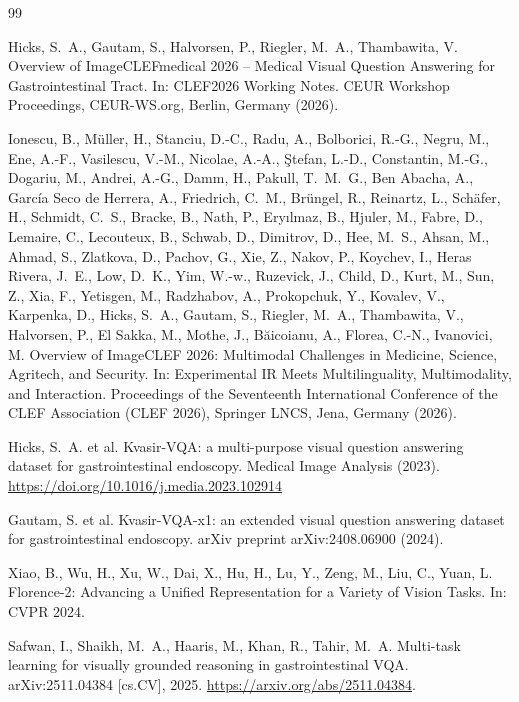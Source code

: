 \documentclass{ceurart}
\begin{document}

\begin{thebibliography}{99}

Hicks, S.\ A., Gautam, S., Halvorsen, P., Riegler, M.\ A., Thambawita, V.
Overview of ImageCLEFmedical 2026 -- Medical Visual Question Answering for
Gastrointestinal Tract. In: CLEF2026 Working Notes. CEUR Workshop Proceedings,
CEUR-WS.org, Berlin, Germany (2026).

Ionescu, B., M{\"u}ller, H., Stanciu, D.-C., Radu, A., Bolborici, R.-G., Negru, M., Ene, A.-F., Vasilescu, V.-M., Nicolae, A.-A., \c{S}tefan, L.-D., Constantin, M.-G., Dogariu, M., Andrei, A.-G., Damm, H., Pakull, T.\ M.\ G., Ben Abacha, A., Garc\'ia Seco de Herrera, A., Friedrich, C.\ M., Br{\"u}ngel, R., Reinartz, L., Sch{\"a}fer, H., Schmidt, C.\ S., Bracke, B., Nath, P., Ery{\i}lmaz, B., Hjuler, M., Fabre, D., Lemaire, C., Lecouteux, B., Schwab, D., Dimitrov, D., Hee, M.\ S., Ahsan, M., Ahmad, S., Zlatkova, D., Pachov, G., Xie, Z., Nakov, P., Koychev, I., Heras Rivera, J.\ E., Low, D.\ K., Yim, W.-w., Ruzevick, J., Child, D., Kurt, M., Sun, Z., Xia, F., Yetisgen, M., Radzhabov, A., Prokopchuk, Y., Kovalev, V., Karpenka, D., Hicks, S.\ A., Gautam, S., Riegler, M.\ A., Thambawita, V., Halvorsen, P., El Sakka, M., Mothe, J., B\u{a}icoianu, A., Florea, C.-N., Ivanovici, M.
Overview of ImageCLEF 2026: Multimodal Challenges in Medicine, Science, Agritech, and Security.
In: Experimental IR Meets Multilinguality, Multimodality, and Interaction.
Proceedings of the Seventeenth International Conference of the CLEF Association (CLEF 2026),
Springer LNCS, Jena, Germany (2026).

Hicks, S.\ A. et al. Kvasir-VQA: a multi-purpose visual question
answering dataset for gastrointestinal endoscopy. Medical Image Analysis (2023).
\url{https://doi.org/10.1016/j.media.2023.102914}

Gautam, S. et al. Kvasir-VQA-x1: an extended visual question
answering dataset for gastrointestinal endoscopy. arXiv preprint arXiv:2408.06900 (2024).

Xiao, B., Wu, H., Xu, W., Dai, X., Hu, H., Lu, Y., Zeng, M., Liu, C.,
Yuan, L. Florence-2: Advancing a Unified Representation for a Variety
of Vision Tasks. In: CVPR 2024.

Safwan, I., Shaikh, M.\ A., Haaris, M., Khan, R., Tahir, M.\ A.
Multi-task learning for visually grounded reasoning in gastrointestinal
VQA. arXiv:2511.04384 [cs.CV], 2025.
\url{https://arxiv.org/abs/2511.04384}.


\end{thebibliography}
\end{document}
